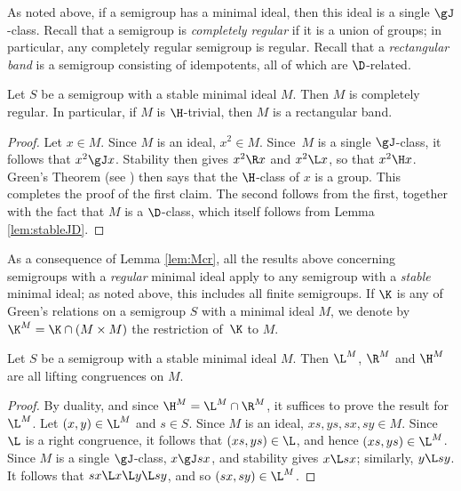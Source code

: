 As noted above, if a semigroup has a minimal ideal, then this ideal is a single $\gJ$-class.  Recall that a semigroup is \emph{completely regular} if it is a union of groups; in particular, any completely regular semigroup is regular.  Recall that a \emph{rectangular band} is a semigroup consisting of idempotents, all of which are $\D$-related.

\begin{lemma}\label{lem:Mcr}
Let $S$ be a semigroup with a stable minimal ideal $M$.  Then $M$ is completely regular.  In particular, if $M$ is $\H$-trivial, then $M$ is a rectangular band.
\end{lemma}

\begin{proof} 
Let $x\in M$.  Since $M$ is an ideal, $x^2\in M$.  Since~$M$ is a single $\gJ$-class, it follows that $x^2\gJ x$.  Stability then gives $x^2\R x$ and $x^2\L x$, so that $x^2\H x$.  Green's Theorem (see \cite[Theorem 2.2.5]{Howie}) then says that the $\H$-class of $x$ is a group.  This completes the proof of the first claim.  The second follows from the first, together with the fact that $M$ is a $\D$-class, which itself follows from Lemma \ref{lem:stableJD}.
\end{proof}

As a consequence of Lemma \ref{lem:Mcr}, all the results above concerning semigroups with a \emph{regular} minimal ideal apply to any semigroup with a \emph{stable} minimal ideal; as noted above, this includes all finite semigroups.
%
If $\K$ is any of Green's relations on a semigroup $S$ with a minimal ideal $M$, we denote by ${\K^M}={\K}\cap(M\times M)$ the restriction of~$\K$ to $M$.

\begin{lemma}\label{lem:lift}
Let $S$ be a semigroup with a stable minimal ideal $M$.  Then $\L^M$, $\R^M$ and $\H^M$ are all lifting congruences on $M$.
\end{lemma}

\begin{proof} By duality, and since ${\H^M}={\L^M}\cap{\R^M}$, it suffices to prove the
result for $\L^M$.  Let $(x,y)\in{\L^M}$ and $s\in S$.  Since $M$ is an ideal,
$xs,ys,sx,sy\in M$.  Since $\L$ is a right congruence, it follows that
$(xs,ys)\in{\L}$, and hence $(xs,ys)\in{\L^M}$.  Since $M$ is a single
$\gJ$-class, $x\gJ sx$, and stability gives $x\L sx$; similarly, $y\L sy$.  It
follows that $sx\L x\L y\L sy$, and so $(sx,sy)\in{\L^M}$. \end{proof}

